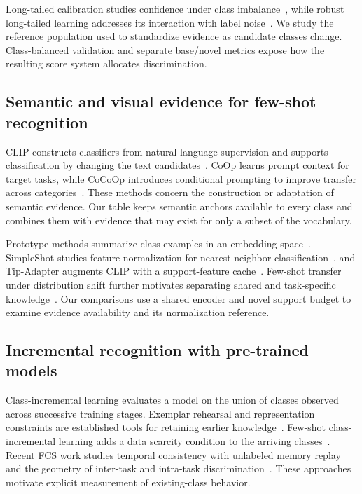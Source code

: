 \documentclass[research]{fcs}
\begin{document}
Long-tailed calibration studies confidence under class imbalance~\cite{zhong2021mislas}, while robust long-tailed learning addresses its interaction with label noise~\cite{wei2026robust}. We study the reference population used to standardize evidence as candidate classes change. Class-balanced validation and separate base/novel metrics expose how the resulting score system allocates discrimination.

\subsection{Semantic and visual evidence for few-shot recognition}
CLIP constructs classifiers from natural-language supervision and supports classification by changing the text candidates~\cite{radford2021clip}. CoOp learns prompt context for target tasks, while CoCoOp introduces conditional prompting to improve transfer across categories~\cite{zhou2022coop,zhou2022cocoop}. These methods concern the construction or adaptation of semantic evidence. Our table keeps semantic anchors available to every class and combines them with evidence that may exist for only a subset of the vocabulary.

Prototype methods summarize class examples in an embedding space~\cite{snell2017prototypical}. SimpleShot studies feature normalization for nearest-neighbor classification~\cite{wang2019simpleshot}, and Tip-Adapter augments CLIP with a support-feature cache~\cite{zhang2022tipadapter}. Few-shot transfer under distribution shift further motivates separating shared and task-specific knowledge~\cite{zhu2023combat}. Our comparisons use a shared encoder and novel support budget to examine evidence availability and its normalization reference.

\subsection{Incremental recognition with pre-trained models}
Class-incremental learning evaluates a model on the union of classes observed across successive training stages. Exemplar rehearsal and representation constraints are established tools for retaining earlier knowledge~\cite{rebuffi2017icarl}. Few-shot class-incremental learning adds a data scarcity condition to the arriving classes~\cite{tao2020fewshot}. Recent FCS work studies temporal consistency with unlabeled memory replay~\cite{wang2025memory} and the geometry of inter-task and intra-task discrimination~\cite{tang2027global}. These approaches motivate explicit measurement of existing-class behavior.
\end{document}
